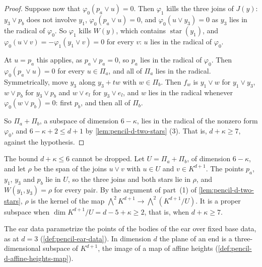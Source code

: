 \begin{proof}
  Suppose now that $\varphi_0(p_a \vee u) = 0$. Then $\varphi_1$ kills
  the three joins of $J(y)$: $y_3 \vee p_b$ does not involve $y_1$,
  $\varphi_0(p_a \vee u) = 0$, and $\varphi_0(u \vee y_3) = 0$ as $y_3$
  lies in the radical of $\varphi_0$. So $\varphi_1$ kills $W(y)$, which
  contains $\operatorname{star}(y_1)$, and
  $\varphi_0(u \vee v) = -\varphi_1(y_1 \vee v) = 0$ for every $v$: $u$
  lies in the radical of $\varphi_0$.

  At $u = p_a$ this applies, as $p_a \vee p_a = 0$, so $p_a$ lies in the
  radical of $\varphi_0$. Then $\varphi_0(p_a \vee u) = 0$ for every
  $u \in \Pi_a$, and all of $\Pi_a$ lies in the radical. Symmetrically,
  move $y_3$ along $y_3 + tw$ with $w \in \Pi_b$. Then $f_w$ is
  $y_1 \vee w$ for $y_1 \vee y_3$, $w \vee p_b$ for $y_3 \vee p_b$ and
  $w \vee e_l$ for $y_3 \vee e_l$, and $w$ lies in the radical whenever
  $\varphi_0(w \vee p_b) = 0$: first $p_b$, and then all of $\Pi_b$.

  So $\Pi_a + \Pi_b$, a subspace of dimension $6 - \kappa$, lies in the
  radical of the nonzero form $\varphi_0$, and
  $6 - \kappa + 2 \le d + 1$ by \cref{lem:pencil-d-two-stars} (3). That
  is, $d + \kappa \ge 7$, against the hypothesis.
\end{proof}

The bound $d + \kappa \le 6$ cannot be dropped. Let
$U = \Pi_a + \Pi_b$, of dimension $6 - \kappa$, and let $\rho$ be the
span of the joins $u \vee v$ with $u \in U$ and $v \in K^{d+1}$. The
points $p_a$, $y_1$, $y_3$ and $p_b$ lie in $U$, so the three joins and
both stars lie in $\rho$, and $W(y_1, y_3) = \rho$ for every pair. By
the argument of part~(1) of \cref{lem:pencil-d-two-stars}, $\rho$ is the
kernel of the map $\bigwedge^2 K^{d+1} \to \bigwedge^2(K^{d+1}/U)$. It
is a proper subspace when $\dim K^{d+1}/U = d - 5 + \kappa \ge 2$, that
is, when $d + \kappa \ge 7$.

The ear data parametrize the points of the bodies of the ear over fixed
base data, as at $d = 3$ (\cref{def:pencil-ear-data}). In dimension $d$
the plane of an end is a three-dimensional subspace of $K^{d+1}$, the
image of a map of affine heights (\cref{def:pencil-d-affine-heights-map}).

